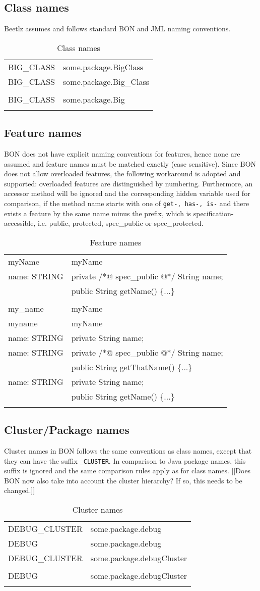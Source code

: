 \documentclass[11pt]{amsart}
\newcommand{\mytablebeg}{\begin{table}[h]\centering\begin{footnotesize}
\begin{tabular}{m{7cm}|m{7cm}} }
\newcommand{\mytableend}[2]{\end{tabular}\end{footnotesize}\caption{#1} \label{#2}\end{table}}
\newcommand{\tick}{\ding{52}}
\newcommand{\cross}{\ding{55}}
\newcommand{\goodline}[2]{\tick #1 & #2\\ \hdashline}
\newcommand{\badline}[2]{\cross #1 & #2 \\ \hdashline}
\newcommand{\emptyline}{\hspace{2mm} & \hspace{2mm}\\ \hdashline}
\begin{document}
\subsection{Class names}\hfill \newline
Beetlz assumes and follows standard BON and JML naming conventions.
\mytablebeg
\goodline{BIG\_CLASS}{some.package.BigClass}
\goodline{BIG\_CLASS}{some.package.Big\_Class}
\emptyline
\badline{BIG\_CLASS}{some.package.Big}
\mytableend{Class names}{}

\subsection{Feature names}\hfill \newline
BON does not have explicit naming conventions for features, hence none are assumed and feature names must be matched exactly (case sensitive). Since BON does not allow overloaded features, the following workaround is adopted and supported: overloaded features are distinguished by numbering.
Furthermore, an accessor method will be ignored and the corresponding hidden variable used for comparison, if the method name starts with one of \texttt{get-, has-, is-} and there exists a feature by the same name minus the prefix, which is specification-accessible, i.e. public, protected, spec\_public or spec\_protected.
\mytablebeg
\goodline{myName}{myName}
\goodline{name: STRING}{private /*@ spec\_public @*/ String name; \\ & public String getName() \{...\}}
\emptyline
\badline{my\_name}{myName}
\badline{myname}{myName}
\badline{name: STRING}{private String name;}
\badline{name: STRING}{private /*@ spec\_public @*/ String name; \\ & public String getThatName() \{...\}}
\badline{name: STRING}{private String name; \\ & public String getName() \{...\}}
\mytableend{Feature names}{}




\subsection{Cluster/Package names}\hfill \newline
Cluster names in BON follows the same conventions as class names, except that they can have the suffix \texttt{\_CLUSTER}. In comparison to Java package names, this suffix is ignored and the same comparison rules apply as for class names.
[[Does BON now also take into account the cluster hierarchy? If so, this needs to be changed.]]
\mytablebeg
\goodline{DEBUG\_CLUSTER}{some.package.debug}
\goodline{DEBUG}{some.package.debug}
\goodline{DEBUG\_CLUSTER}{some.package.debugCluster}
\emptyline
\badline{DEBUG}{some.package.debugCluster}
\mytableend{Cluster names}{}
\end{document}
